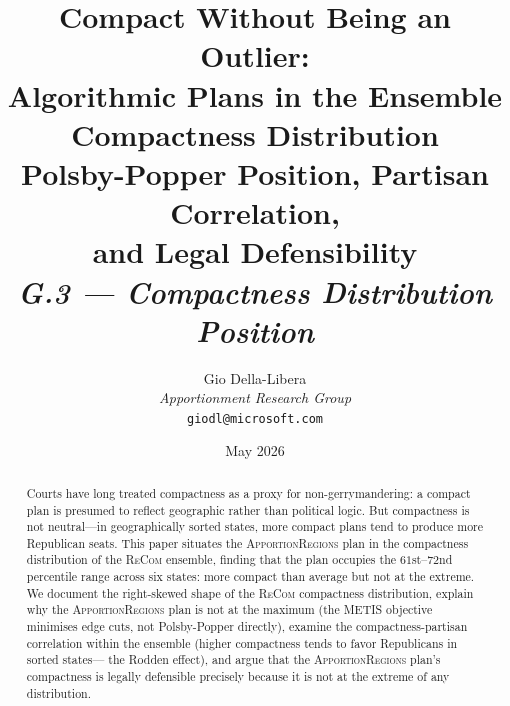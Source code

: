 \documentclass[12pt]{article}
\title{%
  \textbf{Compact Without Being an Outlier:}\\
  \textbf{Algorithmic Plans in the Ensemble Compactness Distribution}\\[0.4em]
  \large Polsby-Popper Position, Partisan Correlation,\\
  and Legal Defensibility\\[0.8em]
  \normalsize\textit{G.3 --- Compactness Distribution Position}%
}
\author{%
  Gio Della-Libera\\
  \textit{Apportionment Research Group}\\
  \small\texttt{giodl@microsoft.com}
}
\date{May 2026}
\newcommand{\ar}{\textsc{ApportionRegions}}
\newcommand{\recom}{\textsc{ReCom}}
\begin{document}
\maketitle

\begin{abstract}
\noindent
Courts have long treated compactness as a proxy for non-gerrymandering:
a compact plan is presumed to reflect geographic rather than political logic.
But compactness is not neutral---in geographically sorted states, more compact
plans tend to produce more Republican seats.  This paper situates the \ar{}
plan in the compactness distribution of the \recom{} ensemble, finding that
the plan occupies the $61$st--$72$nd percentile range across six states:
more compact than average but not at the extreme.  We document the right-skewed
shape of the \recom{} compactness distribution, explain why the \ar{} plan
is not at the maximum (the METIS objective minimises edge cuts, not
Polsby-Popper directly), examine the compactness-partisan correlation within
the ensemble (higher compactness tends to favor Republicans in sorted states---
the Rodden effect), and argue that the \ar{} plan's compactness is legally
defensible precisely because it is not at the extreme of any distribution.
\end{abstract}

\tableofcontents
\newpage











\end{document}
